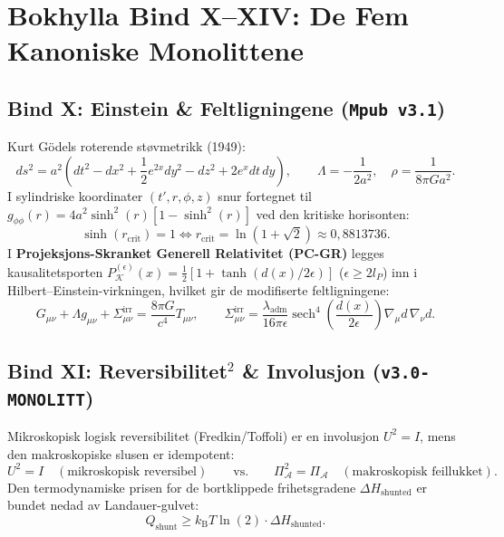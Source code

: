 \documentclass[11pt,a4paper,oneside]{book}
\theoremstyle{definition}
\begin{document}
\chapter{Bokhylla Bind X--XIV: De Fem Kanoniske Monolittene}

\section{Bind X: Einstein \& Feltligningene (\texttt{Mpub v3.1})}
Kurt Gödels roterende støvmetrikk (1949):
\begin{equation}
ds^2 = a^2\left(dt^2 - dx^2 + \frac{1}{2}e^{2x}dy^2 - dz^2 + 2e^x dt\,dy\right), \qquad \Lambda = -\frac{1}{2a^2}, \quad \rho = \frac{1}{8\pi G a^2}.
\end{equation}
I sylindriske koordinater $(t', r, \phi, z)$ snur fortegnet til $g_{\phi\phi}(r) = 4a^2\sinh^2(r)[1 - \sinh^2(r)]$ ved den kritiske horisonten:
\begin{equation}
\sinh(r_{\text{crit}}) = 1 \iff r_{\text{crit}} = \ln(1 + \sqrt{2}) \approx 0,8813736.
\end{equation}
I \textbf{Projeksjons-Skranket Generell Relativitet (PC-GR)} legges kausalitetsporten $P_{\mathcal{K}}^{(\epsilon)}(x) = \frac{1}{2}[1 + \tanh(d(x)/2\epsilon)]$ ($\epsilon \ge 2l_P$) inn i Hilbert--Einstein-virkningen, hvilket gir de modifiserte feltligningene:
\begin{equation}
\boxed{G_{\mu\nu} + \Lambda g_{\mu\nu} + \Sigma_{\mu\nu}^{\text{irr}} = \frac{8\pi G}{c^4}T_{\mu\nu}, \qquad \Sigma_{\mu\nu}^{\text{irr}} = \frac{\lambda_{\text{adm}}}{16\pi\epsilon}\operatorname{sech}^4\!\left(\frac{d(x)}{2\epsilon}\right)\nabla_\mu d\,\nabla_\nu d.}
\end{equation}

\section{Bind XI: Reversibilitet$^2$ \& Involusjon (\texttt{v3.0-MONOLITT})}
Mikroskopisk logisk reversibilitet (Fredkin/Toffoli) er en involusjon $U^2 = I$, mens den makroskopiske slusen er idempotent:
\begin{equation}
U^2 = I \quad (\text{mikroskopisk reversibel}) \qquad \text{vs.} \qquad \Pi_{\mathcal{A}}^2 = \Pi_{\mathcal{A}} \quad (\text{makroskopisk feillukket}).
\end{equation}
Den termodynamiske prisen for de bortklippede frihetsgradene $\Delta H_{\text{shunted}}$ er bundet nedad av Landauer-gulvet:
\begin{equation}
\boxed{Q_{\text{shunt}} \ge k_{\text{B}} T \ln(2) \cdot \Delta H_{\text{shunted}}.}
\end{equation}
\end{document}

